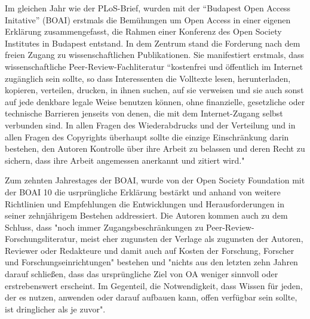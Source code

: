 {Im gleichen Jahr wie der PLoS-Brief, wurden mit der “Budapest Open Access Initative” (BOAI)\cite{boai_2012} erstmals die Bemühungen um Open Access in einer eigenen Erklärung zusammengefasst\cite{cite:21a}, die Rahmen einer Konferenz des Open Society Institutes in Budapest entstand. In dem Zentrum stand die Forderung nach dem freien Zugang zu wissenschaftlichen Publikationen. Sie manifestiert erstmals, dass wissenschaftliche Peer-Review-Fachliteratur “kostenfrei und öffentlich im Internet zugänglich sein sollte, so dass Interessenten die Volltexte lesen, herunterladen, kopieren, verteilen, drucken, in ihnen suchen, auf sie verweisen und sie auch sonst auf jede denkbare legale Weise benutzen können, ohne finanzielle, gesetzliche oder technische Barrieren jenseits von denen, die mit dem Internet-Zugang selbst verbunden sind. In allen Fragen des Wiederabdrucks und der Verteilung und in allen Fragen des Copyrights überhaupt sollte die einzige Einschränkung darin bestehen, den Autoren Kontrolle über ihre Arbeit zu belassen und deren Recht zu sichern, dass ihre Arbeit angemessen anerkannt und zitiert wird."\cite{boai_2012} 

Zum zehnten Jahrestages der BOAI, wurde von der Open Society Foundation mit der BOAI 10 die usrprüngliche Erklärung bestärkt und anhand von weitere Richtlinien und Empfehlungen die Entwicklungen und Herausforderungen in seiner zehnjährigem Bestehen addressiert. Die Autoren kommen auch zu dem Schluss, dass  "noch immer Zugangsbeschränkungen zu Peer-Review-Forschungsliteratur, meist eher zugunsten der Verlage als zugunsten der Autoren, Reviewer oder Redakteure und damit auch auf Kosten der Forschung, Forscher und Forschungseinrichtungen" bestehen und "nichts aus den letzten zehn Jahren darauf schließen, dass das ursprüngliche Ziel von OA weniger sinnvoll oder erstrebenswert erscheint. Im Gegenteil, die Notwendigkeit, dass Wissen für jeden, der es nutzen, anwenden oder darauf aufbauen kann, offen verfügbar sein sollte, ist dringlicher als je zuvor".\cite{boai_2012}

}
